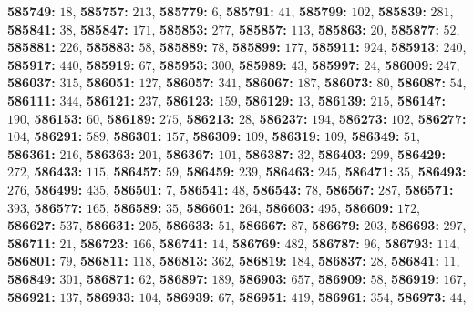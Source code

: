 \textsf{\bfseries 585749:} $18$, \textsf{\bfseries 585757:} $213$, \textsf{\bfseries 585779:} $6$, \textsf{\bfseries 585791:} $41$, \textsf{\bfseries 585799:} $102$, \textsf{\bfseries 585839:} $281$, \textsf{\bfseries 585841:} $38$, \textsf{\bfseries 585847:} $171$, \textsf{\bfseries 585853:} $277$, \textsf{\bfseries 585857:} $113$, \textsf{\bfseries 585863:} $20$, \textsf{\bfseries 585877:} $52$, \textsf{\bfseries 585881:} $226$, \textsf{\bfseries 585883:} $58$, \textsf{\bfseries 585889:} $78$, \textsf{\bfseries 585899:} $177$, \textsf{\bfseries 585911:} $924$, \textsf{\bfseries 585913:} $240$, \textsf{\bfseries 585917:} $440$, \textsf{\bfseries 585919:} $67$, \textsf{\bfseries 585953:} $300$, \textsf{\bfseries 585989:} $43$, \textsf{\bfseries 585997:} $24$, \textsf{\bfseries 586009:} $247$, \textsf{\bfseries 586037:} $315$, \textsf{\bfseries 586051:} $127$, \textsf{\bfseries 586057:} $341$, \textsf{\bfseries 586067:} $187$, \textsf{\bfseries 586073:} $80$, \textsf{\bfseries 586087:} $54$, \textsf{\bfseries 586111:} $344$, \textsf{\bfseries 586121:} $237$, \textsf{\bfseries 586123:} $159$, \textsf{\bfseries 586129:} $13$, \textsf{\bfseries 586139:} $215$, \textsf{\bfseries 586147:} $190$, \textsf{\bfseries 586153:} $60$, \textsf{\bfseries 586189:} $275$, \textsf{\bfseries 586213:} $28$, \textsf{\bfseries 586237:} $194$, \textsf{\bfseries 586273:} $102$, \textsf{\bfseries 586277:} $104$, \textsf{\bfseries 586291:} $589$, \textsf{\bfseries 586301:} $157$, \textsf{\bfseries 586309:} $109$, \textsf{\bfseries 586319:} $109$, \textsf{\bfseries 586349:} $51$, \textsf{\bfseries 586361:} $216$, \textsf{\bfseries 586363:} $201$, \textsf{\bfseries 586367:} $101$, \textsf{\bfseries 586387:} $32$, \textsf{\bfseries 586403:} $299$, \textsf{\bfseries 586429:} $272$, \textsf{\bfseries 586433:} $115$, \textsf{\bfseries 586457:} $59$, \textsf{\bfseries 586459:} $239$, \textsf{\bfseries 586463:} $245$, \textsf{\bfseries 586471:} $35$, \textsf{\bfseries 586493:} $276$, \textsf{\bfseries 586499:} $435$, \textsf{\bfseries 586501:} $7$, \textsf{\bfseries 586541:} $48$, \textsf{\bfseries 586543:} $78$, \textsf{\bfseries 586567:} $287$, \textsf{\bfseries 586571:} $393$, \textsf{\bfseries 586577:} $165$, \textsf{\bfseries 586589:} $35$, \textsf{\bfseries 586601:} $264$, \textsf{\bfseries 586603:} $495$, \textsf{\bfseries 586609:} $172$, \textsf{\bfseries 586627:} $537$, \textsf{\bfseries 586631:} $205$, \textsf{\bfseries 586633:} $51$, \textsf{\bfseries 586667:} $87$, \textsf{\bfseries 586679:} $203$, \textsf{\bfseries 586693:} $297$, \textsf{\bfseries 586711:} $21$, \textsf{\bfseries 586723:} $166$, \textsf{\bfseries 586741:} $14$, \textsf{\bfseries 586769:} $482$, \textsf{\bfseries 586787:} $96$, \textsf{\bfseries 586793:} $114$, \textsf{\bfseries 586801:} $79$, \textsf{\bfseries 586811:} $118$, \textsf{\bfseries 586813:} $362$, \textsf{\bfseries 586819:} $184$, \textsf{\bfseries 586837:} $28$, \textsf{\bfseries 586841:} $11$, \textsf{\bfseries 586849:} $301$, \textsf{\bfseries 586871:} $62$, \textsf{\bfseries 586897:} $189$, \textsf{\bfseries 586903:} $657$, \textsf{\bfseries 586909:} $58$, \textsf{\bfseries 586919:} $167$, \textsf{\bfseries 586921:} $137$, \textsf{\bfseries 586933:} $104$, \textsf{\bfseries 586939:} $67$, \textsf{\bfseries 586951:} $419$, \textsf{\bfseries 586961:} $354$, \textsf{\bfseries 586973:} $44$, 
